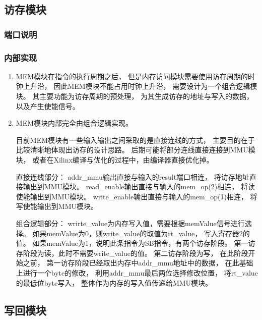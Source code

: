     \subsection{访存模块}
        \subsubsection{端口说明}
            
        \subsubsection{内部实现}
            \begin{enumerate}
            \item
            MEM模块在指令的执行周期之后，%
            但是内存访问模块需要使用访存周期的时钟上升沿，%
            因此MEM模块不能占用时钟上升沿，%
            需要设计为一个组合逻辑模块。%
            其主要功能为访存周期的预处理，%
            为其生成访存的地址与写入的数据，以及产生使能信号。
            \item
            MEM模块内部完全由组合逻辑实现。%

            目前MEM模块有一些输入输出之间采取的是直接连线的方式，%
            主要目的在于比较清晰地体现出访存的设计思路。%
            后期可能将部分连线直接连接到MMU模块，%
            或者在Xilinx编译与优化的过程中，由编译器直接优化掉。

            直接连线部分：%
            addr\_mmu输出直接与输入的result端口相连，%
            将访存地址直接输出到MMU模块。%
            read\_enable输出直接与输入的mem\_op(2)相连，%
            将读使能输出到MMU模块。%
            write\_enable输出直接与输入的mem\_op(1)相连，
            将写使能输出到MMU模块。
        
            组合逻辑部分：%
            wrirte\_value为内存写入值，需要根据memValue信号进行选择。%
            如果memValue为0，则write\_value的取值为rt\_value，%
            写入寄存器2的值。%
            如果memValue为1，说明此条指令为SB指令，有两个访存阶段。%
            第一访存阶段为读，此时不需要write\_value的值。%
            第二访存阶段为写，%
            在此阶段开始之前，%
            第一访存阶段已经取出内存中addr\_mmu地址中的数据，%
            在此基础上进行一个byte的修改，%
            利用addr\_mmu最后两位选择修改位置，%
            将rt\_value的最低位byte写入，%
            整体作为内存的写入值传递给MMU模块。%
        \end{enumerate}
    \subsection{写回模块}
